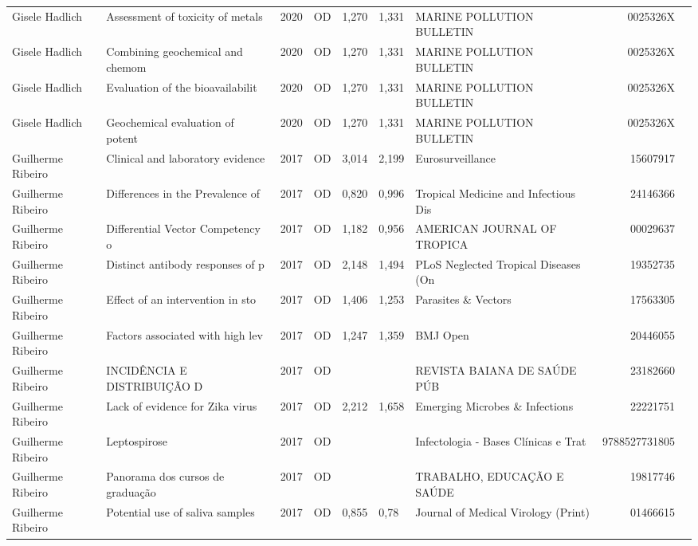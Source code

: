 \documentclass[12pt,brazil]{article}\usepackage[]{graphicx}\usepackage[]{xcolor}
\begin{document}
\begin{longtable}{lllrrllrr}
Gisele Hadlich & Assessment of toxicity of metals & 2020 & OD & 1,270 & 1,331 & MARINE POLLUTION BULLETIN & 0025326X \\
\rowcolor{coautr}\rowcolor{coautr}\rowcolor{coautr}\rowcolor{coautr}\rowcolor{coautr}\rowcolor{coautr}\rowcolor{coautr}\rowcolor{coautr}\rowcolor{coautr}\rowcolor{coautr}\rowcolor{coautr}\rowcolor{coautr}\rowcolor{coautr}\rowcolor{coautr}\rowcolor{coautr}\rowcolor{coautr}Gisele Hadlich & Combining geochemical and chemom & 2020 & OD & 1,270 & 1,331 & MARINE POLLUTION BULLETIN & 0025326X \\
Gisele Hadlich & Evaluation of the bioavailabilit & 2020 & OD & 1,270 & 1,331 & MARINE POLLUTION BULLETIN & 0025326X \\
Gisele Hadlich & Geochemical evaluation of potent & 2020 & OD & 1,270 & 1,331 & MARINE POLLUTION BULLETIN & 0025326X \\
Guilherme Ribeiro & Clinical and laboratory evidence & 2017 & OD & 3,014 & 2,199 & Eurosurveillance & 15607917 \\
Guilherme Ribeiro & Differences in the Prevalence of & 2017 & OD & 0,820 & 0,996 & Tropical Medicine and Infectious Dis & 24146366 \\
Guilherme Ribeiro & Differential Vector Competency o & 2017 & OD & 1,182 & 0,956 & AMERICAN JOURNAL OF TROPICA & 00029637 \\
Guilherme Ribeiro & Distinct antibody responses of p & 2017 & OD & 2,148 & 1,494 & PLoS Neglected Tropical Diseases (On & 19352735 \\
Guilherme Ribeiro & Effect of an intervention in sto & 2017 & OD & 1,406 & 1,253 & Parasites \& Vectors & 17563305 \\
Guilherme Ribeiro & Factors associated with high lev & 2017 & OD & 1,247 & 1,359 & BMJ Open & 20446055 \\
Guilherme Ribeiro & INCIDÊNCIA E DISTRIBUIÇÃO D & 2017 & OD &  &  & REVISTA BAIANA DE SAÚDE PÚB & 23182660 \\
Guilherme Ribeiro & Lack of evidence for Zika virus  & 2017 & OD & 2,212 & 1,658 & Emerging Microbes \& Infections & 22221751 \\
Guilherme Ribeiro & Leptospirose & 2017 & OD &  &  & Infectologia - Bases Clínicas e Trat & 9788527731805 \\
Guilherme Ribeiro & Panorama dos cursos de graduação & 2017 & OD &  &  & TRABALHO, EDUCAÇÃO E SAÚDE  & 19817746 \\
Guilherme Ribeiro & Potential use of saliva samples  & 2017 & OD & 0,855 & 0,78 & Journal of Medical Virology (Print) & 01466615 \\

\end{longtable}
\end{document}

